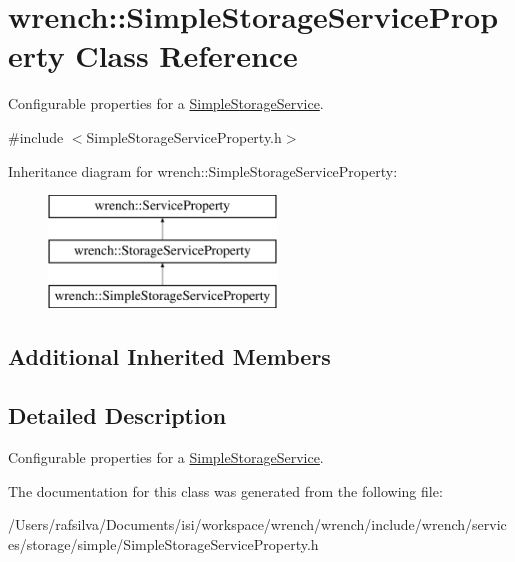 \hypertarget{classwrench_1_1_simple_storage_service_property}{}\section{wrench\+:\+:Simple\+Storage\+Service\+Property Class Reference}
\label{classwrench_1_1_simple_storage_service_property}


Configurable properties for a \hyperlink{classwrench_1_1_simple_storage_service}{Simple\+Storage\+Service}.  




{\ttfamily \#include $<$Simple\+Storage\+Service\+Property.\+h$>$}

Inheritance diagram for wrench\+:\+:Simple\+Storage\+Service\+Property\+:\begin{figure}[H]
\begin{center}
\leavevmode
\includegraphics[height=3.000000cm]{classwrench_1_1_simple_storage_service_property}
\end{center}
\end{figure}
\subsection*{Additional Inherited Members}


\subsection{Detailed Description}
Configurable properties for a \hyperlink{classwrench_1_1_simple_storage_service}{Simple\+Storage\+Service}. 

The documentation for this class was generated from the following file\+:\begin{DoxyCompactItemize}
\item 
/\+Users/rafsilva/\+Documents/isi/workspace/wrench/wrench/include/wrench/services/storage/simple/Simple\+Storage\+Service\+Property.\+h\end{DoxyCompactItemize}
